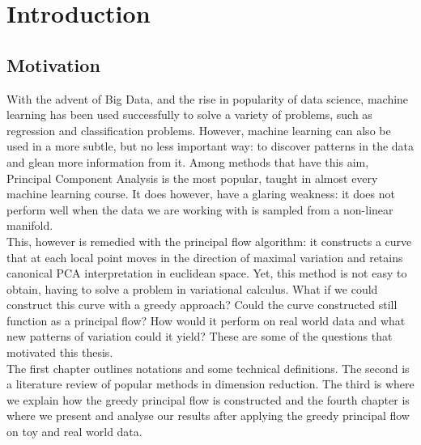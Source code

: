 \documentclass[12pt]{report}
\begin{document}

\newpage
\tableofcontents
\listoffigures
\newpage

\chapter{Introduction}

\section{Motivation}

With the advent of Big Data, and the rise in popularity of data science,
machine learning has been used successfully to solve a variety of problems, 
such as regression and classification problems. However, machine learning
can also be used in a more subtle, but no less important way: to discover patterns
in the data and glean more information from it. Among methods that have this aim, 
Principal Component Analysis is the most popular, taught in almost every
machine learning course. It does however, have a glaring weakness: it does 
not perform well when the data we are working with is sampled from a non-linear manifold.
\\
This, however is remedied with the principal flow algorithm: 
it constructs a curve that at each local point moves in the direction of
maximal variation and retains canonical PCA interpretation in euclidean space.
Yet, this method is not easy to obtain, having to solve a problem in variational calculus. 
What if we could construct this curve with a greedy approach? 
Could the curve constructed still function as a principal flow? 
How would it perform on real world data and what new patterns of variation could it 
yield? These are some of the questions that motivated this thesis.\\
The first chapter outlines notations and some technical definitions. The 
second is a literature review of popular methods in dimension reduction. 
The third is where we explain how the greedy principal flow is constructed and 
the fourth chapter is where we present and analyse
our results after applying the greedy principal flow on toy and real world data.
\end{document}
